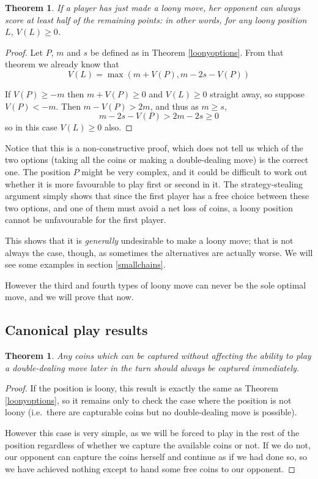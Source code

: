 \documentclass[a4paper,twocolumn]{article}
\newtheorem{freecoins}[thm]{Theorem}
\newtheorem{loonynonneg}[thm]{Theorem}
\begin{document}
\begin{loonynonneg}\label{loonynonneg}
  If a player has just made a loony move, her opponent can always
  score at least half of the remaining points: in other words, for any
  loony position $L$, $V(L) \ge 0$.
\end{loonynonneg}

\begin{proof}
  Let $P$, $m$ and $s$ be defined as in Theorem
  \ref{loonyoptions}. From that theorem we already know that $$V(L) =
  \max(m+V(P), m-2s-V(P))$$

  If $V(P) \ge -m$ then $m+V(P) \ge 0$ and $V(L) \ge 0$ straight away,
  so suppose $V(P) < -m$. Then $m-V(P) > 2m$, and thus as $m \ge
  s$, $$m-2s-V(P) > 2m-2s \ge 0$$ so in this case $V(L) \ge 0$ also.
\end{proof}

Notice that this is a non-constructive proof, which does not tell us
which of the two options (taking all the coins or making a
double-dealing move) is the correct one. The position $P$ might be
very complex, and it could be difficult to work out whether it is more
favourable to play first or second in it. The strategy-stealing
argument simply shows that since the first player has a free choice
between these two options, and one of them must avoid a net loss of
coins, a loony position cannot be unfavourable for the first player.

This shows that it is \emph{generally} undesirable to make a loony
move; that is not always the case, though, as sometimes the
alternatives are actually worse. We will see some examples in section
\ref{smallchains}.

However the third and fourth types of loony move can never be the sole
optimal move, and we will prove that now.

\subsection{Canonical play results}

\begin{freecoins}\label{freecoins}
  Any coins which can be captured without affecting the ability to
  play a double-dealing move later in the turn should always be
  captured immediately.
\end{freecoins}

\begin{proof}
  If the position is loony, this result is exactly the same as Theorem
  \ref{loonyoptions}, so it remains only to check the case where the
  position is not loony (i.e.\ there are capturable coins but no
  double-dealing move is possible).

  However this case is very simple, as we will be forced to play in
  the rest of the position regardless of whether we capture the
  available coins or not. If we do not, our opponent can capture the
  coins herself and continue as if we had done so, so we have achieved
  nothing except to hand some free coins to our opponent.
\end{proof}
\end{document}
